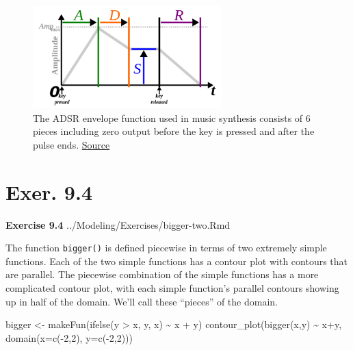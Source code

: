 \documentclass[
  letterpaper,
  DIV=11,
  numbers=noendperiod,
  oneside]{article}
\newenvironment{Shaded}{\begin{snugshade}}{\end{snugshade}}
\newcommand{\AttributeTok}[1]{\textcolor[rgb]{0.40,0.45,0.13}{#1}}
\newcommand{\DecValTok}[1]{\textcolor[rgb]{0.68,0.00,0.00}{#1}}
\newcommand{\FunctionTok}[1]{\textcolor[rgb]{0.28,0.35,0.67}{#1}}
\newcommand{\NormalTok}[1]{\textcolor[rgb]{0.00,0.23,0.31}{#1}}
\newcommand{\OtherTok}[1]{\textcolor[rgb]{0.00,0.23,0.31}{#1}}
\newcommand{\SpecialCharTok}[1]{\textcolor[rgb]{0.37,0.37,0.37}{#1}}
\begin{document}
\begin{multicols}{2}
\begin{figure}
{\centering \includegraphics[width=0.65\textwidth,height=\textheight]{Preliminaries/www/adsr.png}

}

\caption{\label{fig-ADSR}The ADSR envelope function used in music
synthesis consists of 6 pieces including zero output before the key is
pressed and after the pulse ends.
\href{https://en.wikipedia.org/wiki/Envelope_(music)}{Source}}

\end{figure}

\hypertarget{exer.-9.4}{%
\section*{Exer. 9.4}\label{exer.-9.4}}

\textbf{Exercise 9.4} ../Modeling/Exercises/bigger-two.Rmd

The function \texttt{bigger()} is defined piecewise in terms of two
extremely simple functions. Each of the two simple functions has a
contour plot with contours that are parallel. The piecewise combination
of the simple functions has a more complicated contour plot, with each
simple function's parallel contours showing up in half of the domain.
We'll call these ``pieces'' of the domain.

\begin{Shaded}
\begin{Highlighting}[]
\NormalTok{bigger }\OtherTok{\textless{}{-}} \FunctionTok{makeFun}\NormalTok{(}\FunctionTok{ifelse}\NormalTok{(y }\SpecialCharTok{\textgreater{}}\NormalTok{ x, y, x) }\SpecialCharTok{\textasciitilde{}}\NormalTok{ x }\SpecialCharTok{+}\NormalTok{ y)}
\FunctionTok{contour\_plot}\NormalTok{(}\FunctionTok{bigger}\NormalTok{(x,y) }\SpecialCharTok{\textasciitilde{}}\NormalTok{ x}\SpecialCharTok{+}\NormalTok{y, }\FunctionTok{domain}\NormalTok{(}\AttributeTok{x=}\FunctionTok{c}\NormalTok{(}\SpecialCharTok{{-}}\DecValTok{2}\NormalTok{,}\DecValTok{2}\NormalTok{), }\AttributeTok{y=}\FunctionTok{c}\NormalTok{(}\SpecialCharTok{{-}}\DecValTok{2}\NormalTok{,}\DecValTok{2}\NormalTok{)))}
\end{Highlighting}
\end{Shaded}


\end{multicols}
\end{document}
